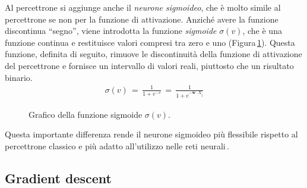 Al percettrone si aggiunge anche il \textsl{neurone sigmoideo}, che è molto simile al percettrone se non per la funzione di attivazione. Anziché avere la funzione discontinua ``segno'', viene introdotta la funzione \textsl{sigmoide} $\sigma(v)$, che è una funzione continua e restituisce valori compresi tra zero e uno (Figura\,\ref{fig:sigmoid-function}). Questa funzione, definita di seguito, rimuove le discontinuità della funzione di attivazione del percettrone e fornisce un intervallo di valori reali, piuttosto che un risultato binario.
% 
\begin{gather*}
    \sigma(v) \, = \, \frac{1}{1 + e^{-v}} \, = \, \frac{1}{1 + e^{-\mathbf{w} \cdot X_j}}
\end{gather*}
% 
\begin{figure}[!t]
    \centering
    
    \caption[Grafico della funzione sigmoide $\sigma(v)$.]{Grafico della funzione sigmoide $\sigma(v)$.}\label{fig:sigmoid-function}
\end{figure}
% 
Questa importante differenza rende il neurone sigmoideo più flessibile rispetto al percettrone classico e più adatto all'utilizzo nelle reti neurali\,\cite{nielsen2015neural}.

\subsection{Gradient descent}

